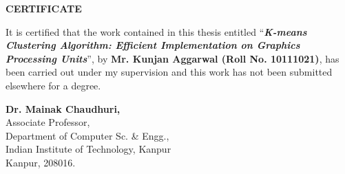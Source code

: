 
\vspace {1.0in}
\begin{center}
\begin{large}
{\bf CERTIFICATE}
\end{large}
\end{center}
\vskip 0.2in
It is certified that the work contained in this 
thesis entitled ``{\bf{\textit{K-means Clustering Algorithm: Efficient Implementation on Graphics Processing Units}}}'', by {\textbf{Mr. Kunjan Aggarwal (Roll No. 10111021)}}, 
has been carried out under my supervision and this work has not been submitted elsewhere for a degree.
\vskip 1in
\begin{flushleft}
    {\bf Dr. Mainak Chaudhuri,} \\ 
    Associate Professor,\\
    Department of Computer Sc. \& Engg., \\
    Indian Institute of Technology, Kanpur\\
    Kanpur, 208016.
\end{flushleft}
